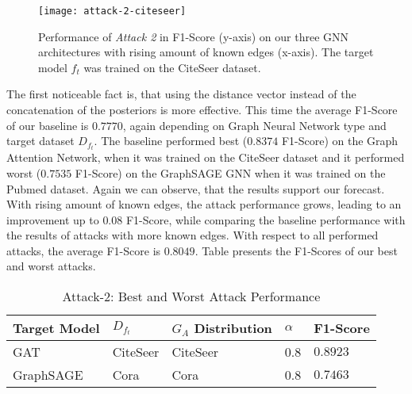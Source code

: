             \begin{figure}[h]
                \begin{center}
                    \texttt{[image: attack-2-citeseer]}
                    \caption[Attack 2 - $D_{f_t} = CiteSeer$]{Performance of \emph{Attack 2} in F1-Score (y-axis) on our three GNN architectures with rising amount of known edges (x-axis). The target model $f_t$ was trained on the CiteSeer dataset.}
                    \label{figure:eval-att2-citeseer}
                \end{center}
            \end{figure}

            The first noticeable fact is, that using the distance vector instead of the concatenation of the posteriors is more effective.
            This time the average F1-Score of our baseline is $0.7770$, again depending on Graph Neural Network type and target dataset $D_{f_t}$.
            The baseline performed best ($0.8374$ F1-Score) on the Graph Attention Network, when it was trained on the CiteSeer dataset and it performed worst ($0.7535$ F1-Score) on the GraphSAGE GNN when it was trained on the Pubmed dataset.
            Again we can observe, that the results support our forecast.
            With rising amount of known edges, the attack performance grows, leading to an improvement up to $0.08$ F1-Score, while comparing the baseline performance with the results of attacks with more known edges.
            With respect to all performed attacks, the average F1-Score is $0.8049$.
            Table  presents the F1-Scores of our best and worst attacks.
            
            \vspace{0.48cm}
            \begin{table}[!h]
                \centering
                \footnotesize
                \begin{tabular}{l|l|l|l|l|}
                \toprule
                Target Model & $D_{f_t}$ & $G_A$ Distribution & $\alpha$ & F1-Score \\
                \midrule
                GAT       & CiteSeer & CiteSeer & 0.8 & $0.8923$ \\
                GraphSAGE & Cora     & Cora     & 0.8 & $0.7463$ \\
                
                \bottomrule
                \end{tabular}
                \caption{Attack-2: Best and Worst Attack Performance}
                \label{table:attack2-best-and-worst-performance}
            \end{table}

